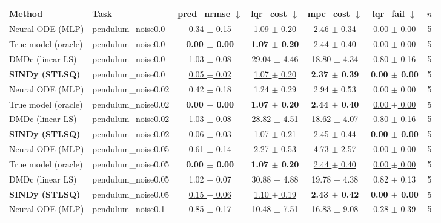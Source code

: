 \begin{tabular}{llccccc}
\toprule
Method & Task & pred\_nrmse $\downarrow$ & lqr\_cost $\downarrow$ & mpc\_cost $\downarrow$ & lqr\_fail $\downarrow$ & $n$ \\
\midrule
Neural ODE (MLP) & pendulum\_noise0.0 & 0.34 $\pm$ 0.15 & 1.09 $\pm$ 0.20 & 2.46 $\pm$ 0.34 & 0.00 $\pm$ 0.00 & 5 \\
True model (oracle) & pendulum\_noise0.0 & \textbf{0.00 $\pm$ 0.00} & \textbf{1.07 $\pm$ 0.20} & \underline{2.44 $\pm$ 0.40} & \underline{0.00 $\pm$ 0.00} & 5 \\
DMDc (linear LS) & pendulum\_noise0.0 & 1.03 $\pm$ 0.08 & 29.04 $\pm$ 4.46 & 18.80 $\pm$ 4.34 & 0.80 $\pm$ 0.16 & 5 \\
\textbf{SINDy (STLSQ)} & pendulum\_noise0.0 & \underline{0.05 $\pm$ 0.02} & \underline{1.07 $\pm$ 0.20} & \textbf{2.37 $\pm$ 0.39} & \textbf{0.00 $\pm$ 0.00} & 5 \\
\midrule
Neural ODE (MLP) & pendulum\_noise0.02 & 0.42 $\pm$ 0.18 & 1.24 $\pm$ 0.29 & 2.94 $\pm$ 0.53 & 0.00 $\pm$ 0.00 & 5 \\
True model (oracle) & pendulum\_noise0.02 & \textbf{0.00 $\pm$ 0.00} & \textbf{1.07 $\pm$ 0.20} & \textbf{2.44 $\pm$ 0.40} & \underline{0.00 $\pm$ 0.00} & 5 \\
DMDc (linear LS) & pendulum\_noise0.02 & 1.03 $\pm$ 0.08 & 28.82 $\pm$ 4.51 & 18.62 $\pm$ 4.07 & 0.80 $\pm$ 0.16 & 5 \\
\textbf{SINDy (STLSQ)} & pendulum\_noise0.02 & \underline{0.06 $\pm$ 0.03} & \underline{1.07 $\pm$ 0.21} & \underline{2.45 $\pm$ 0.44} & \textbf{0.00 $\pm$ 0.00} & 5 \\
\midrule
Neural ODE (MLP) & pendulum\_noise0.05 & 0.61 $\pm$ 0.14 & 2.27 $\pm$ 0.53 & 4.73 $\pm$ 2.57 & 0.00 $\pm$ 0.00 & 5 \\
True model (oracle) & pendulum\_noise0.05 & \textbf{0.00 $\pm$ 0.00} & \textbf{1.07 $\pm$ 0.20} & \underline{2.44 $\pm$ 0.40} & \underline{0.00 $\pm$ 0.00} & 5 \\
DMDc (linear LS) & pendulum\_noise0.05 & 1.02 $\pm$ 0.07 & 30.88 $\pm$ 4.88 & 19.78 $\pm$ 4.38 & 0.82 $\pm$ 0.13 & 5 \\
\textbf{SINDy (STLSQ)} & pendulum\_noise0.05 & \underline{0.15 $\pm$ 0.06} & \underline{1.10 $\pm$ 0.19} & \textbf{2.43 $\pm$ 0.42} & \textbf{0.00 $\pm$ 0.00} & 5 \\
\midrule
Neural ODE (MLP) & pendulum\_noise0.1 & 0.85 $\pm$ 0.17 & 10.48 $\pm$ 7.51 & 16.83 $\pm$ 9.08 & 0.28 $\pm$ 0.39 & 5 \\

\end{tabular}
